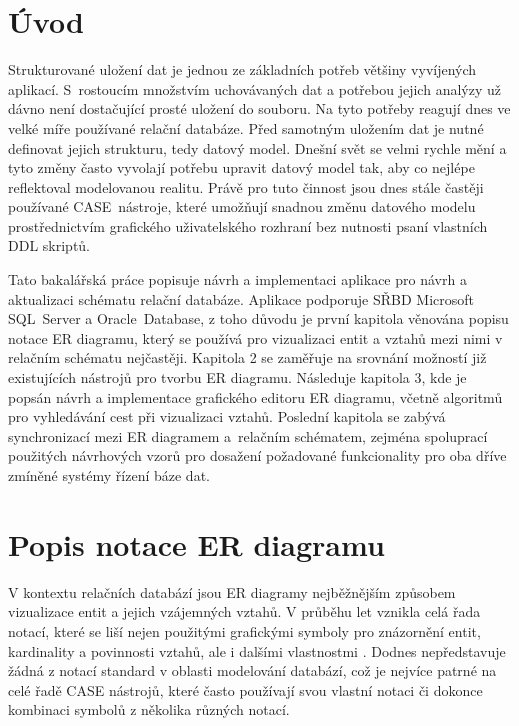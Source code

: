 \documentclass[czech,bachelor,public,dept460,male,oneside]{diploma}
\begin{document}
\MakeTitlePages

\lstlistoflistings

\section{Úvod}
Strukturované uložení dat je jednou ze základních potřeb většiny vyvíjených aplikací. S~rostoucím množstvím uchovávaných dat a potřebou jejich analýzy už dávno není dostačující prosté uložení do souboru. Na tyto potřeby reagují dnes ve velké míře používané relační databáze. Před samotným uložením dat je nutné definovat jejich strukturu, tedy datový model. Dnešní svět se velmi rychle mění a tyto změny často vyvolají potřebu upravit datový model tak, aby co nejlépe reflektoval modelovanou realitu. Právě pro tuto činnost jsou dnes stále častěji používané CASE~nástroje, které umožňují snadnou změnu datového modelu prostřednictvím grafického uživatelského rozhraní bez nutnosti psaní vlastních DDL skriptů.

Tato bakalářská práce popisuje návrh a implementaci aplikace pro návrh a aktualizaci schématu relační databáze. Aplikace podporuje SŘBD Microsoft SQL~Server a Oracle~Database, z toho důvodu je první kapitola věnována popisu notace ER diagramu, který se používá pro vizualizaci entit a vztahů mezi nimi v relačním schématu nejčastěji. Kapitola 2 se zaměřuje na srovnání možností již existujících nástrojů pro tvorbu ER diagramu. Následuje kapitola 3, kde je popsán návrh a implementace grafického editoru ER diagramu, včetně algoritmů pro vyhledávání cest při vizualizaci vztahů. Poslední kapitola se zabývá synchronizací mezi ER diagramem a~relačním schématem, zejména spoluprací použitých návrhových vzorů pro dosažení požadované funkcionality pro oba dříve zmíněné systémy řízení báze dat.

\section{Popis notace ER diagramu}
V kontextu relačních databází jsou ER diagramy nejběžnějším způsobem vizualizace entit a jejich vzájemných vztahů. V průběhu let vznikla celá řada notací, které se liší nejen použitými grafickými symboly pro znázornění entit, kardinality a povinnosti vztahů, ale i dalšími vlastnostmi \cite{compErNotations}. Dodnes nepředstavuje žádná z notací standard v oblasti modelování databází, což je nejvíce patrné na celé řadě CASE nástrojů, které často používají svou vlastní notaci či dokonce kombinaci symbolů z několika různých notací.
\end{document}
